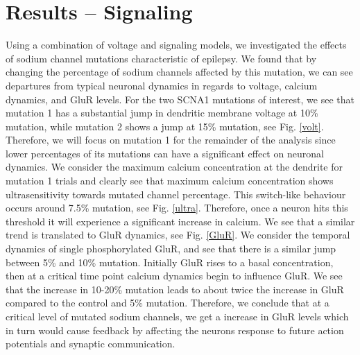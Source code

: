 \section{Results -- Signaling}
Using a combination of voltage and signaling models, we investigated the effects of sodium channel
mutations characteristic of epilepsy. We found that by changing the percentage of sodium channels
affected by this mutation, we can see departures from typical neuronal dynamics in regards to
voltage, calcium dynamics, and GluR levels. For the two SCNA1 mutations of interest, we see that
mutation 1 has a substantial jump in dendritic membrane voltage at 10\% mutation, while mutation 2
shows a jump at 15\% mutation, see Fig. \ref{volt}. Therefore, we will focus on mutation 1 for the
remainder of the analysis since lower percentages of its mutations can have a significant effect on
neuronal dynamics. We consider the maximum calcium concentration at the dendrite for mutation 1
trials and clearly see that maximum calcium concentration shows ultrasensitivity towards mutated
channel percentage. This switch-like behaviour occurs around 7.5\% mutation, see Fig. \ref{ultra}.
Therefore, once a neuron hits this threshold it will experience a significant increase in calcium.
We see that a similar trend is translated to GluR dynamics, see Fig. \ref{GluR}. We consider the
temporal dynamics of single phosphorylated GluR, and see that there is a similar jump between 5\%
and 10\% mutation. Initially GluR rises to a basal concentration, then at a critical time point
calcium dynamics begin to influence GluR. We see that the increase in 10-20\% mutation leads to
about twice the increase in GluR compared to the control and 5\% mutation. Therefore, we conclude
that at a critical level of mutated sodium channels, we get a increase in GluR levels which in turn
would cause feedback by affecting the neurons response to future action potentials and synaptic
communication.

